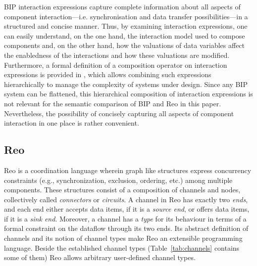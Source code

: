 \documentclass[submission,copyright,creativecommons,hidelinks]{eptcs}
\theoremstyle{plain} \newtheorem{theorem}{Theorem}
\theoremstyle{definition}
\theoremstyle{remark}
\newcommand{\tab}[1]{Table~\ref{tab:#1}}
\begin{document}
BIP interaction expressions capture complete information about all aspects
of component interaction---i.e. synchronisation and data transfer
possibilities---in a structured and concise manner.  Thus, by
examining interaction expressions, one can easily understand, on the one
hand, the interaction model used to compose components and, on the
other hand, how the valuations of data variables affect the
enabledness of the interactions and how these valuations are modified.
Furthermore, a formal definition of a composition operator on
interaction expressions is provided in \cite{BBJS14}, which allows combining
such expressions hierarchically to manage the complexity of systems
under design.  Since any BIP system can be flattened, this
hierarchical composition of interaction expressions is not relevant
for the semantic comparison of BIP and Reo in this paper.
Nevertheless, the possibility of concisely capturing all aspects of
component interaction in one place is rather convenient.





\subsection{Reo}
\label{sec:reo}

Reo is a coordination language wherein graph like structures express concurrency constraints (e.g., synchronization, exclusion, ordering, etc.) among multiple components. 
These structures consist of a composition of channels and nodes, collectively called \emph{connectors} or \emph{circuits}. 
A channel in Reo has exactly two \emph{ends}, and each end either accepts data items, if it is a \emph{source end}, or offers data items, if it is a \emph{sink end}. 
Moreover, a channel has a \emph{type} for its behaviour in terms of a formal constraint on the dataflow through its two ends. 
Its abstract definition of channels and its notion of channel types make Reo an extensible programming language.
Beside the established channel types (\tab{channels} contains some of them) Reo allows arbitrary user-defined channel types.
\end{document}
